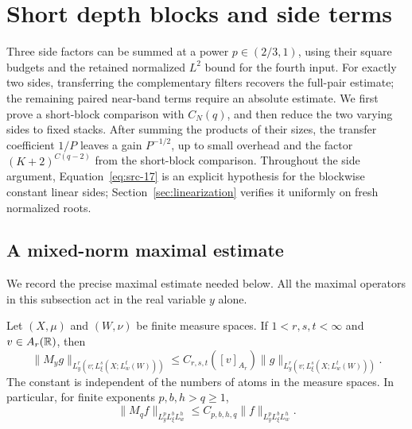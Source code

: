 \section{Short depth blocks and side terms}\label{sec:sides}

Three side factors can be summed at a power $p\in(2/3,1)$, using
their square budgets and the retained normalized $L^2$ bound for
the fourth input.  For exactly two sides, transferring the
complementary filters recovers the full-pair estimate; the remaining
paired near-band terms require an absolute estimate.  We first
prove a short-block comparison with $C_N(q)$, and then reduce the
two varying sides to fixed stacks.  After summing the products of
their sizes, the transfer coefficient $1/P$ leaves a gain $P^{-1/2}$,
up to small overhead and the factor $(K+2)^{C(q-2)}$ from the
short-block comparison.  Throughout the side argument,
Equation~\eqref{eq:src-17} is an explicit hypothesis for the
blockwise constant linear sides; Section~\ref{sec:linearization}
verifies it uniformly on fresh normalized roots.

\subsection{A mixed-norm maximal estimate}

We record the precise maximal estimate needed below.  All the maximal
operators in this subsection act in the real variable $y$ alone.

\begin{lemma}\label{lem:sides-mixed-maximal}
Let $(X,\mu)$ and $(W,\nu)$ be finite measure spaces.  If
$1<r,s,t<\infty$ and $v\in A_r(\mathbb R)$, then
\[
 \|M_y g\|_{L_y^r(v;L_\xi^s(X;L_w^t(W)))}
 \le C_{r,s,t}([v]_{A_r})
       \|g\|_{L_y^r(v;L_\xi^s(X;L_w^t(W)))}.
\]
The constant is independent of the numbers of atoms in the measure
spaces.  In particular, for finite exponents $p,b,h>q\geq1$,
\[
 \|M_q f\|_{L_y^pL_\xi^bL_w^h}
 \le C_{p,b,h,q}\|f\|_{L_y^pL_\xi^bL_w^h}.
\]
\end{lemma}

